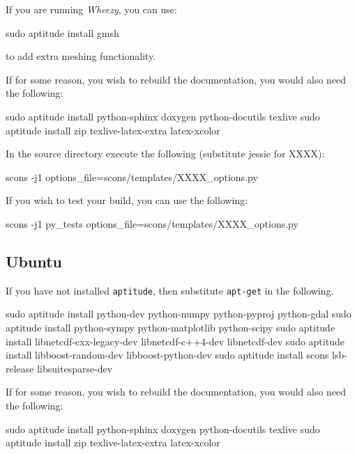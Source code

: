 \noindent If you are running \textit{Wheezy}, you can use:
\begin{shellCode}
sudo aptitude install gmsh 
\end{shellCode}
to add extra meshing functionality.

\begin{optionalstep}
If for some reason, you wish to rebuild the documentation, you would also need the following:
\begin{shellCode}
sudo aptitude install python-sphinx doxygen python-docutils texlive 
sudo aptitude install zip texlive-latex-extra latex-xcolor 
\end{shellCode}
\end{optionalstep}

\noindent In the source directory execute the following (substitute jessie for XXXX):
\begin{shellCode}
scons -j1 options_file=scons/templates/XXXX_options.py
\end{shellCode}

\noindent If you wish to test your build, you can use the following:
\begin{shellCode}
scons -j1 py_tests options_file=scons/templates/XXXX_options.py 
\end{shellCode}

\subsection{Ubuntu}\label{sec:ubsrc}

If you have not installed \texttt{aptitude}, then substitute \texttt{apt-get} in the following.
\begin{shellCode}
sudo aptitude install python-dev python-numpy python-pyproj python-gdal 
sudo aptitude install python-sympy python-matplotlib python-scipy
sudo aptitude install libnetcdf-cxx-legacy-dev libnetcdf-c++4-dev libnetcdf-dev 
sudo aptitude install libboost-random-dev libboost-python-dev 
sudo aptitude install scons lsb-release libsuitesparse-dev
\end{shellCode}


\begin{optionalstep}
If for some reason, you wish to rebuild the documentation, you would also need the following:
\begin{shellCode}
sudo aptitude install python-sphinx doxygen python-docutils texlive 
sudo aptitude install zip texlive-latex-extra latex-xcolor 
\end{shellCode}
\end{optionalstep}

